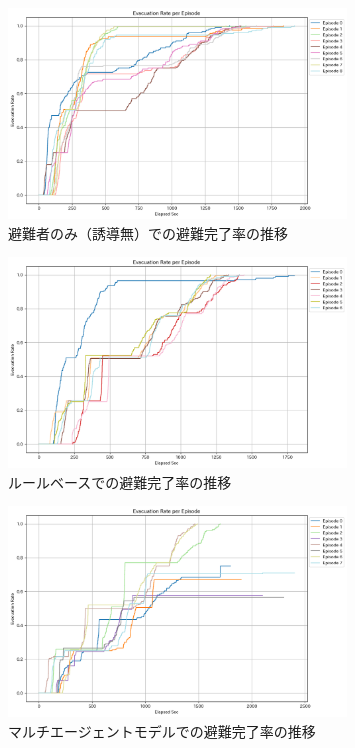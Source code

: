 \begin{figure}[H]
  \centering
  \includegraphics[width=0.8\textwidth]{Figures/Yokosuka-EvaOnly-ERE.png}
  \caption{避難者のみ（誘導無）での避難完了率の推移}
\end{figure}

\begin{figure}[H] 
  \centering 
  \includegraphics[width=0.8\textwidth]{Figures/Yokosuka-RuleModel-ERE.png}
  \caption{ルールベースでの避難完了率の推移}
\end{figure}

\begin{figure}[H] 
  \centering 
  \includegraphics[width=0.8\textwidth]{Figures/Yokosuka-AgentModel-ERE.png}
  \caption{マルチエージェントモデルでの避難完了率の推移}
\end{figure}

